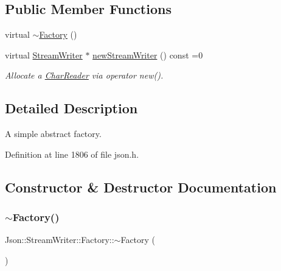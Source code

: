 \subsection*{Public Member Functions}
\begin{DoxyCompactItemize}
\item 
virtual \hyperlink{class_json_1_1_stream_writer_1_1_factory_ad334ad5e81e3b9b1768620a446366ff1}{$\sim$\+Factory} ()
\item 
virtual \hyperlink{class_json_1_1_stream_writer}{Stream\+Writer} $\ast$ \hyperlink{class_json_1_1_stream_writer_1_1_factory_a9d30ec53e8288cd53befccf1009c5f31}{new\+Stream\+Writer} () const =0
\begin{DoxyCompactList}\small\item\em Allocate a \hyperlink{class_json_1_1_char_reader}{Char\+Reader} via operator new(). \end{DoxyCompactList}\end{DoxyCompactItemize}


\subsection{Detailed Description}
A simple abstract factory. 

Definition at line 1806 of file json.\+h.



\subsection{Constructor \& Destructor Documentation}
\mbox{\label{class_json_1_1_stream_writer_1_1_factory_ad334ad5e81e3b9b1768620a446366ff1}} 
\subsubsection{\texorpdfstring{$\sim$\+Factory()}{~Factory()}}
{\footnotesize\ttfamily Json\+::\+Stream\+Writer\+::\+Factory\+::$\sim$\+Factory (\begin{DoxyParamCaption}{ }\end{DoxyParamCaption})\hspace{0.3cm}{\ttfamily [virtual]}}



